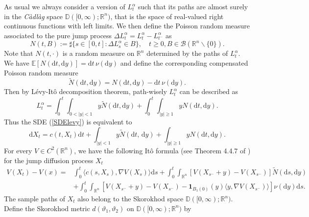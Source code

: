 \documentclass[11pt,reqno]{amsart}
\theoremstyle{definition}
\theoremstyle{remark}
\numberwithin{equation}{section}
\begin{document}
As usual we always consider a version of $L_t^\alpha$ such that its paths are almost surely in the \emph{C\`adl\`ag} space $\mathbb{D}([0,\infty);\mathbb{R}^{n})$, that is the space of real-valued right continuous functions with left limits. We then define the Poisson random measure associated to the pure jump process $\Delta L^{\alpha}_t =L^{\alpha}_{t}-L^{\alpha}_{t^-}$ as
\begin{equation*}
    N(t,B) := \sharp \{s\in [0,t]:\Delta L^{\alpha}_{s} \in B\}, \quad t\geq 0, B\in \mathscr{B}(\mathbb{R}^n\backslash \{0\}).
\end{equation*}
Note that $N(t,\cdot)$ is a random measure on $\mathbb{R}^n$ determined by the paths of $L_t^\alpha$. We have $\mathbb{E}[N(\mathrm{d}t,\mathrm{d}y)] = \mathrm{d}t\,\nu(\mathrm{d}y)$ and define the corresponding compensated Poisson random measure 
\begin{equation*}
   \widetilde{N}(\mathrm{d}t,\mathrm{d}y)=N(\mathrm{d}t,\mathrm{d}y)-\mathrm{d}t\,\nu(\mathrm{d}y) .
\end{equation*}
Then by L\'{e}vy-It\^{o} decomposition theorem, path-wisely $L^{\alpha}_t$ can be described as
\begin{equation*}
    L^{\alpha}_t = \int_0^t \int_{0<|y|<1}y\widetilde{N}(\mathrm{d}t,\mathrm{d}y)+ \int_0^t\int_{|y|\geq 1}y N(\mathrm{d}t,\mathrm{d}y).
\end{equation*}
Thus the SDE (\ref{SDElevy}) is equivalent to
\begin{equation}\label{Lequu}
 \mathrm{d}X_t = c(t,X_{t})\mathrm{d}t + \int_{|y|<1}y\widetilde{N}(\mathrm{d}t,\,\mathrm{d}y) + \int_{|y|\geq 1}yN(\mathrm{d}t,\mathrm{d}y).
\end{equation}
For every $V \in C^{2}(\mathbb{R}^n)$, we have the following It\^{o} formula (see Theorem 4.4.7 of \cite{A2004}) for the jump diffusion process $X_{t}$
\begin{equation}
\label{eq:ItoC2}
\begin{aligned}
    V(X_{t}) - V(x) =& \int_{0}^{ t} \langle c(s,X_s), \nabla V(X_s)\rangle \mathrm{d}s  + \int_{0}^{t} \int_{\mathbb{R}^n} [V(X_{s^{-}}+ y)-V(X_{s^{-}})]\widetilde{N}(\mathrm{d}s,\mathrm{d}y) \\
    & +  \int_{0}^{t} \int_{\mathbb{R}^n}[V(X_{s^{-}}+y)-V(X_{s^{-}}) - \mathbf{1}_{B_{1}(0)}(y)\langle y, \nabla V(X_{s^{-}}) \rangle ]\nu(\mathrm{d}y)\mathrm{d}s.
\end{aligned}
\end{equation}
The sample paths of $X_{t}$ also belong to the Skorokhod space $\mathbb{D}([0,\infty);\mathbb{R}^{n})$. Define the Skorokhod metric $d(\vartheta_1, \vartheta_2)$ on $\mathbb{D}([0,\infty);\mathbb{R}^{n})$ by
\end{document}
